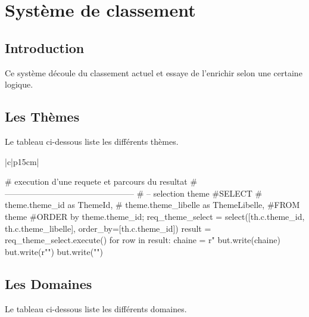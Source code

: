 \documentclass[12pt,titlepage]{book}
\begin{document}
\mainmatter

\chapter{Système de classement}

\section{Introduction}
Ce système découle du classement actuel et essaye de l'enrichir selon une certaine logique.

\section{Les Thèmes}
Le tableau ci-dessous liste les différents thèmes.
\vspace{\baselineskip}

\renewcommand{\arraystretch}{1.2}
\begin{supertabular}{|c|p{15cm}|}

\begin{lbdpython}
# execution d'une requete et parcours du resultat
# -----------------------------------------------
# -- selection theme
#SELECT
#   theme.theme_id as ThemeId,
#   theme.theme_libelle as ThemeLibelle,
#FROM theme
#ORDER by theme.theme_id;
req_theme_select = select([th.c.theme_id, th.c.theme_libelle],
                           order_by=[th.c.theme_id])
result = req_theme_select.execute()
for row in result:
  chaine = r"%
  but.write(chaine)
  but.write(r"\hline")
  but.write("\n")

\end{lbdpython}
\end{supertabular}


\section{Les Domaines}
Le tableau ci-dessous liste les différents domaines.
\vspace{\baselineskip}
\end{document}
